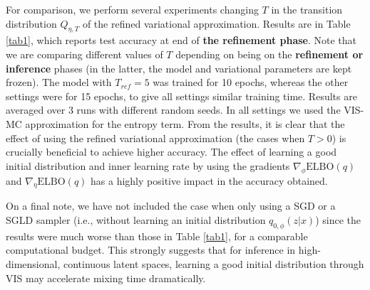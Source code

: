 For comparison, we perform several experiments changing $T$ in 
the transition distribution $Q_{\eta, T}$ of 
the refined variational approximation. %
Results are in Table \ref{tab1}, which reports
test accuracy at 
end of {\bf the refinement phase}. Note that we are comparing different values of $T$ depending on being on the {\bf refinement or inference} phases (in the latter, the model and variational parameters are kept frozen). The model with $T_{ref} = 5$ was trained for 10 epochs, whereas the other settings were for 15 epochs, to give all settings similar training time.  Results are averaged over 3 runs with different random seeds. In all settings we used the VIS-MC approximation for the entropy term. From the results, it is clear that the effect of using the refined variational approximation (the cases when $T > 0$) is crucially beneficial to achieve higher accuracy. The effect of learning a good initial distribution and inner learning rate by using the gradients $\nabla_{\phi} \mbox{ELBO}(q)$ and $\nabla_{\eta} \mbox{ELBO}(q)$ has a highly positive impact in the accuracy obtained.

On a final note, we have not included the case when only using a SGD or a SGLD sampler (i.e., without learning an initial distribution $q_{0, \phi} (z|x)$) since the results were much worse than those in Table \ref{tab1}, for a comparable computational budget. This strongly suggests that for inference in high-dimensional, continuous latent spaces, learning a good initial distribution through VIS may accelerate mixing time
dramatically.

